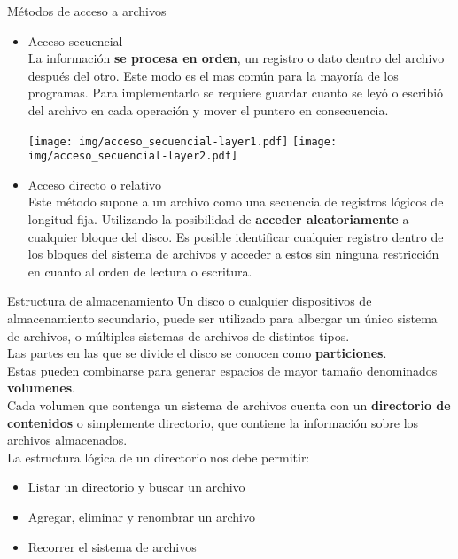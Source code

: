 \documentclass[aspectratio=169]{beamer}
\begin{document}
\begin{frame}[fragile,t]{Métodos de acceso a archivos}
    \begin{itemize}
    \item \textcolor{naranjauca}{Acceso secuencial}\\
    {\small La información \textbf{se procesa en orden}, un registro o dato dentro del archivo después del otro. Este modo es el mas común para la mayoría de los programas. Para implementarlo se requiere guardar cuanto se leyó o escribió del archivo en cada operación y mover el puntero en consecuencia.}\\
    \bigskip
    \begin{center}
    \texttt{[image: img/acceso\_secuencial-layer1.pdf]}\hspace{1cm}
    \texttt{[image: img/acceso\_secuencial-layer2.pdf]}
    \end{center}
    \bigskip
    \pause
    \item \textcolor{naranjauca}{Acceso directo o relativo}\\
    {\small Este método supone a un archivo como una secuencia de registros lógicos de longitud fija. Utilizando la posibilidad de \textbf{acceder aleatoriamente} a cualquier bloque del disco. Es posible identificar cualquier registro dentro de los bloques del sistema de archivos y acceder a estos sin ninguna restricción en cuanto al orden de lectura o escritura.}
    \end{itemize}
\end{frame}

\begin{frame}[fragile,t]{Estructura de almacenamiento}
    Un disco o cualquier dispositivos de almacenamiento secundario, puede ser utilizado para albergar un único sistema de archivos, o múltiples sistemas de archivos de distintos tipos.\\
    \bigskip
    Las partes en las que se divide el disco se conocen como \textbf{particiones}.\\
    Estas pueden combinarse para generar espacios de mayor tamaño denominados \textbf{volumenes}.\\
    \bigskip
    \pause
    Cada volumen que contenga un sistema de archivos cuenta con un \textbf{directorio de contenidos} o simplemente directorio,
    que contiene la información sobre los archivos almacenados.\\
    \bigskip
    La estructura lógica de un directorio nos debe permitir:
    \begin{itemize}
    \setlength\itemsep{0px}
    \item \textcolor{verdeuca}{Listar un directorio y buscar un archivo}
    \item \textcolor{verdeuca}{Agregar, eliminar y renombrar un archivo}
    \item \textcolor{verdeuca}{Recorrer el sistema de archivos}
    \end{itemize}
\end{frame}
\end{document}
